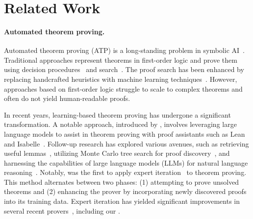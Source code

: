 \section{Related Work}
\paragraph{Automated theorem proving.} 
Automated theorem proving (ATP) is a long-standing problem in symbolic AI~\citep{robinson2001handbook}. Traditional approaches represent theorems in first-order logic and prove them using decision procedures~\citep{de2008z3,barbosa2022cvc5} and search~\citep{kovacs2013first,schulz2019faster}. The proof search has been enhanced by replacing handcrafted heuristics with machine learning techniques~\citep{urban2011malecop,kaliszyk2018reinforcement}. However, approaches based on first-order logic struggle to scale to complex theorems and often do not yield human-readable proofs.



In recent years, learning-based theorem proving has undergone a significant transformation. A notable approach, introduced by \citet{polu2020generative}, involves leveraging large language models to assist in theorem proving with proof assistants such as Lean~\citep{de2015lean, moura2021lean} and Isabelle~\citep{paulson1994isabelle}. Follow-up research has explored various avenues, such as retrieving useful lemmas~\citep{irving2016deepmath,mikula2024magnushammer,yang2024leandojo}, utilizing Monte Carlo tree search for proof discovery~\citep{lample2022hypertree}, and harnessing the capabilities of large language models (LLMs) for natural language reasoning~\citep{jiang2022draft,lin2024lean}. Notably, \cite{polu2023formal} was the first to apply expert iteration~\citep{anthony2017thinking} to theorem proving. This method alternates between two phases: (1) attempting to prove unsolved theorems and (2) enhancing the prover by incorporating newly discovered proofs into its training data. Expert iteration has yielded significant improvements in several recent provers~\citep{wu2024internlm2,xin2024deepseekv15}, including our {\prover}. 

